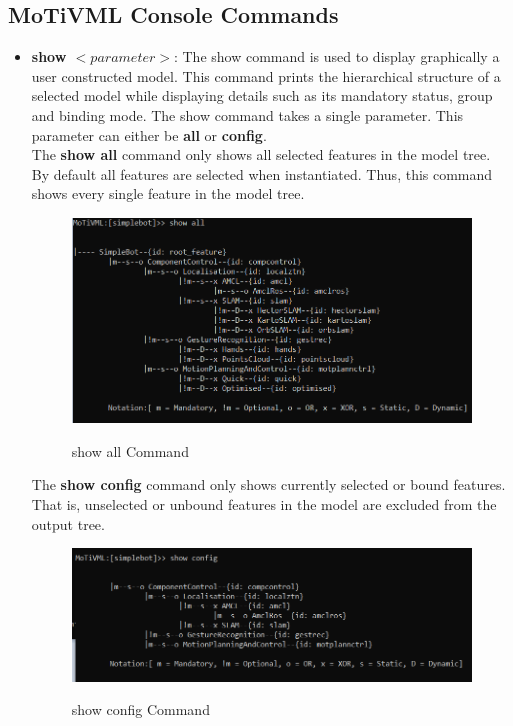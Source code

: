 \documentclass{article}
\begin{document}
\subsection{MoTiVML Console Commands}
\begin{itemize}
	\item \textbf{show $<parameter>$}: The show command is used to display graphically a user constructed model. This command prints the hierarchical structure of a selected model while displaying details such as its mandatory status, group and binding mode. The show command takes a single parameter. This parameter can either be \textbf{all} or  \textbf{config}. \\
	
	The \textbf{show all} command only shows all selected features in the model tree. By default all features are selected when instantiated. Thus, this command shows every single feature in the model tree.
	
	\begin{figure}[H]
		\caption{show all Command}
		\centering
		\includegraphics[width=\columnwidth]{images/showall.png}
		\label{showall}
	\end{figure}

	The \textbf{show config} command only shows currently selected or bound features. That is, unselected or unbound features in the model are excluded from the output tree.

	\begin{figure}[H]
		\caption{show config Command}
		\centering
		\includegraphics[width=\columnwidth]{images/showconfig.png}
		\label{showconfig}
	\end{figure}
	

\end{itemize}
\end{document}

